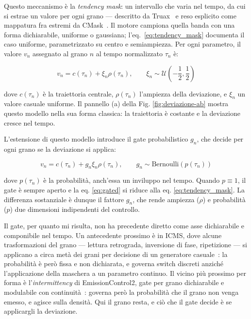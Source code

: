 Questo meccanismo è la \emph{tendency mask}: un intervallo che varia nel
tempo, da cui si estrae un valore per ogni grano --- descritto da
Truax~\cite[p.~17]{Truax1988} e reso esplicito come mappatura fra estremi da
CMask~\cite{Bartetzki1997}. Il motore campiona quella banda con una forma
dichiarabile, uniforme o gaussiana; l'eq.~\ref{eq:tendency_mask} documenta il
caso uniforme, parametrizzato su centro e semiampiezza. Per ogni parametro,
il valore $v_n$ assegnato al grano $n$ al tempo normalizzato $\tau_n$ è:

\begin{equation}
v_n = c(\tau_n) + \xi_n \rho(\tau_n), \qquad 
\xi_n \sim \mathcal{U}\left(-\frac{1}{2}, \frac{1}{2}\right)
\label{eq:tendency_mask}
\end{equation}

dove $c(\tau_n)$ è la traiettoria centrale, $\rho(\tau_n)$ 
l'ampiezza della deviazione, e $\xi_n$ un valore casuale 
uniforme. Il pannello (a) della Fig. \ref{fig:deviazione-ab} mostra 
questo modello nella sua forma classica: la traiettoria è 
costante e la deviazione cresce nel tempo.

L'estensione di questo modello introduce il gate probabilistico $g_n$, che 
decide per ogni grano se la deviazione si applica:

\begin{equation}
v_n = c(\tau_n) + g_n \xi_n \rho(\tau_n), \qquad 
g_n \sim \text{Bernoulli}(p(\tau_n))
\label{eq:gated}
\end{equation}

dove $p(\tau_n)$ è la probabilità, anch'essa un inviluppo nel 
tempo. Quando $p \equiv 1$, il gate è sempre aperto e la 
eq. \ref{eq:gated} si riduce alla 
eq. \ref{eq:tendency_mask}. La differenza sostanziale è dunque 
il fattore $g_n$, che rende ampiezza ($\rho$) e probabilità
($p$) due dimensioni indipendenti del controllo.

Il gate, per quanto mi risulta, non ha precedente diretto come asse dichiarabile
e componibile nel tempo. Un antecedente prossimo è in ICMS, dove alcune
trasformazioni del grano --- lettura retrograda, inversione di fase, ripetizione
--- si applicano a circa metà dei grani per decisione di un generatore
casuale~\cite{DiScipioTisato1993cim}: la probabilità è però fissa e non
dichiarata, e governa switch discreti anziché l'applicazione della maschera a un
parametro continuo. Il vicino più prossimo per forma è l'\emph{intermittency} di
EmissionControl2, gate per grano dichiarabile e modulabile con
continuità~\cite{Roads2021}: governa però la probabilità che il grano non venga
emesso, e agisce sulla densità. Qui il grano resta, e ciò che il gate decide è
se applicargli la deviazione.



